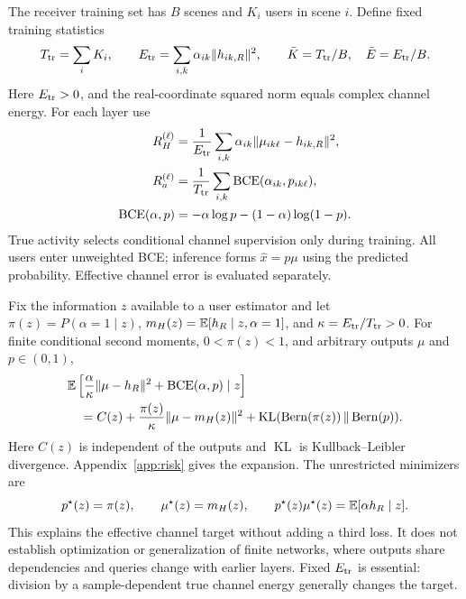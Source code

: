 The receiver training set has $B$ scenes and $K_i$ users in scene $i$.
Define fixed training statistics
\begin{equation}
 T_{\rm tr}=\sum_iK_i,\qquad
 E_{\rm tr}=\sum_{i,k}\alpha_{ik}\|h_{ik,R}\|^2,\qquad
 \bar K=T_{\rm tr}/B,\quad \bar E=E_{\rm tr}/B.
 \label{eq:twc-training-statistics}
\end{equation}
Here $E_{\rm tr}>0$, and the real-coordinate squared norm equals
complex channel energy. For each layer use
\begin{align}
 R_H^{(\ell)}&=\frac{1}{E_{\rm tr}}\sum_{i,k}
     \alpha_{ik}\|\mu_{ik\ell}-h_{ik,R}\|^2,
 \label{eq:twc-channel-loss}\\
 R_a^{(\ell)}&=\frac{1}{T_{\rm tr}}\sum_{i,k}
     {\rm BCE}(\alpha_{ik},p_{ik\ell}),
 \label{eq:twc-activity-loss}\\
 {\rm BCE}(\alpha,p)&=-\alpha\log p-(1-\alpha)\log(1-p).
 \label{eq:twc-bce}
\end{align}
True activity selects conditional channel supervision only during
training. All users enter unweighted BCE; inference forms
$\widehat x=p\mu$ using the predicted probability.
Effective channel error is evaluated separately.

Fix the information $z$ available to a user estimator and let
$\pi(z)=P(\alpha=1\mid z)$,
$m_H(z)=\mathbb{E}[h_R\mid z,\alpha=1]$, and
$\kappa=E_{\rm tr}/T_{\rm tr}>0$.
For finite conditional second moments, $0<\pi(z)<1$, and arbitrary
outputs $\mu$ and $p\in(0,1)$,
\begin{equation}
 \begin{split}
 &\mathbb{E}\left[\frac{\alpha}{\kappa}\|\mu-h_R\|^2+
                       {\rm BCE}(\alpha,p)\mid z\right]\\
 &\quad=C(z)+\frac{\pi(z)}{\kappa}\|\mu-m_H(z)\|^2+
 {\rm KL}({\rm Bern}(\pi(z))\,\|\,{\rm Bern}(p)).
 \end{split}
 \label{eq:twc-risk-decomposition}
\end{equation}
Here $C(z)$ is independent of the outputs and $\operatorname{KL}$ is
Kullback--Leibler divergence. Appendix~\ref{app:risk} gives the
expansion. The unrestricted minimizers are
\begin{equation}
 p^\star(z)=\pi(z),\qquad \mu^\star(z)=m_H(z),\qquad
 p^\star(z)\mu^\star(z)=\mathbb{E}[\alpha h_R\mid z].
 \label{eq:twc-risk-minimizers}
\end{equation}
This explains the effective channel target without adding a third
loss. It does not establish optimization or generalization of finite
networks, where outputs share dependencies and queries change with
earlier layers. Fixed $E_{\rm tr}$ is essential: division by a
sample-dependent true channel energy generally changes the target.

